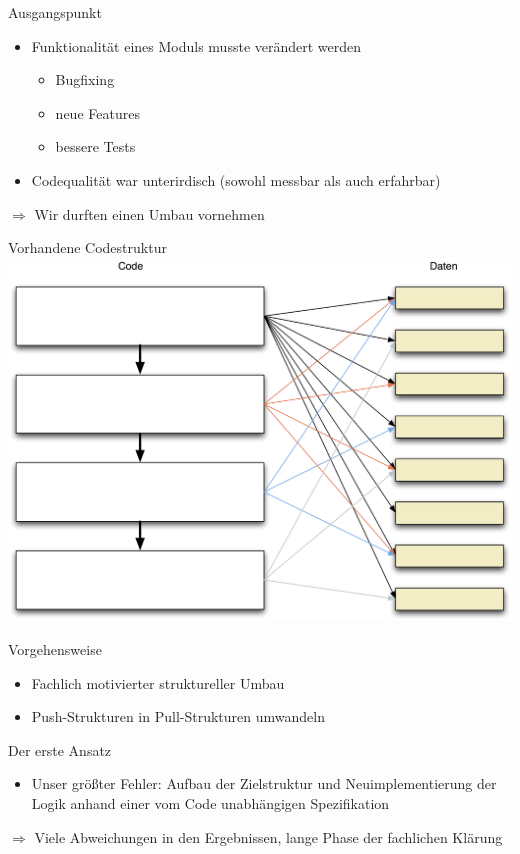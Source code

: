 \begin{frame}[t,fragile]{Ausgangspunkt}
\begin{itemize}
\item Funktionalität eines Moduls musste verändert werden
\begin{itemize}
\item Bugfixing
\item neue Features
\item bessere Tests
\end{itemize}
\item Codequalität war unterirdisch (sowohl messbar als auch erfahrbar)
\end{itemize}

$\Rightarrow$ Wir durften einen Umbau vornehmen
\end{frame}

\begin{frame}[t,fragile]{Vorhandene Codestruktur}
\includegraphics[width=.8 \paperwidth]{Codestruktur.png}
\end{frame}



\begin{frame}[t,fragile]{Vorgehensweise}
\begin{itemize}
\item Fachlich motivierter struktureller Umbau
\item Push-Strukturen in Pull-Strukturen umwandeln
\end{itemize}
\end{frame}

\begin{frame}[t,fragile]{Der erste Ansatz}
\begin{itemize}
\item Unser größter Fehler: Aufbau der Zielstruktur und Neuimplementierung der Logik anhand einer vom Code unabhängigen Spezifikation
\end{itemize}
$\Rightarrow$ Viele Abweichungen in den Ergebnissen, lange Phase der fachlichen Klärung
\end{frame}

